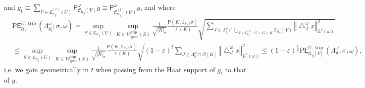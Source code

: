 \documentclass{amsart}%
\theoremstyle{plain}
\numberwithin{equation}{section}
\begin{document}
and $g_{t}\equiv\sum_{V\in\mathfrak{C}_{\mathcal{U}_{g}}^{\left(  t\right)
}\left(  U\right)  }\mathsf{P}_{\mathcal{C}_{\mathcal{U}_{g}}\left(  V\right)
}^{\omega}g\equiv\mathsf{P}_{\mathcal{C}_{\mathcal{U}_{g}}^{\left(  t\right)
}\left(  U\right)  }^{\omega}g$, and where%
\begin{align*}
& \mathrm{P}\mathsf{E}_{\mathcal{U}_{g}}^{U,\operatorname*{trip}}\left(
\Lambda_{g_{t}}^{\omega};\sigma,\omega\right)  =\sup_{S\in\mathfrak{C}%
_{\mathcal{U}_{g}}\left(  U\right)  }\sup_{K\in\mathcal{W}%
_{\operatorname{good}}^{\operatorname*{trip}}\left(  S\right)  }\frac{1}%
{\sqrt{\left\vert K\right\vert _{\sigma}}}\frac{\mathrm{P}\left(
K,\mathbf{1}_{F\setminus S}\sigma\right)  }{\ell\left(  K\right)  }\sqrt
{\sum_{J\in\Lambda_{g}^{\omega}\cap\bigcup_{V\in\mathfrak{C}_{\mathcal{U}_{g}%
}^{\left(  t\right)  }\left(  U\right)  :G\subset K}\mathcal{C}_{\mathcal{U}%
_{g}}\left(  V\right)  }\left\Vert \bigtriangleup_{J}^{\omega}x\right\Vert
_{L^{2}\left(  \omega\right)  }^{2}}\\
& \leq\sup_{S\in\mathfrak{C}_{\mathcal{U}_{g}}\left(  U\right)  }\sup
_{K\in\mathcal{W}_{\operatorname{good}}^{\operatorname*{trip}}\left(
S\right)  }\frac{1}{\sqrt{\left\vert K\right\vert _{\sigma}}}\frac
{\mathrm{P}\left(  K,\mathbf{1}_{F\setminus S}\sigma\right)  }{\ell\left(
K\right)  }\sqrt{\left(  1-\varepsilon\right)  ^{t}\sum_{J\in\Lambda
_{g}^{\omega}\cap\mathcal{D}\left[  K\right]  }\left\Vert \bigtriangleup
_{J}^{\omega}x\right\Vert _{L^{2}\left(  \omega\right)  }^{2}}\leq\left(
1-\varepsilon\right)  ^{\frac{t}{2}}\mathrm{P}\mathsf{E}_{\mathcal{U}%
_{g}\left[  F\right]  }^{U,\operatorname*{trip}}\left(  \Lambda_{g}^{\omega
};\sigma,\omega\right)  ,
\end{align*}
i.e. we gain geometrically in $t$ when passing from the Haar support of
$g_{t}$ to that of $g$.
\end{document}
